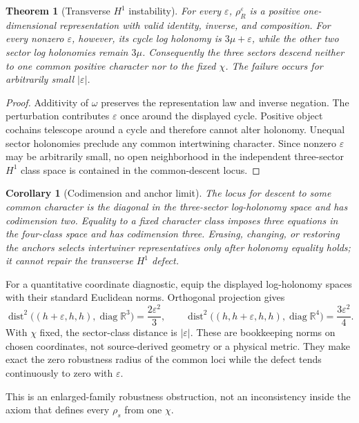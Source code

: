 \documentclass[11pt]{article}
\newtheorem{theorem}{Theorem}
\newtheorem{corollary}{Corollary}
\newcommand{\R}{\mathbb{R}}
\begin{document}
\begin{theorem}[Transverse $H^1$ instability]
For every $\varepsilon$, $\rho_R^\varepsilon$ is a positive
one-dimensional representation with valid identity, inverse, and composition.
For every nonzero $\varepsilon$, however, its cycle log holonomy is
$3\mu+\varepsilon$, while the other two sector log holonomies remain $3\mu$.
Consequently the three sectors descend neither to one common positive
character nor to the fixed $\chi$.  The failure occurs for arbitrarily small
$|\varepsilon|$.
\end{theorem}

\begin{proof}
Additivity of $\omega$ preserves the representation law and inverse negation.
The perturbation contributes $\varepsilon$ once around the displayed cycle.
Positive object cochains telescope around a cycle and therefore cannot alter
holonomy.  Unequal sector holonomies preclude any common intertwining
character.  Since nonzero $\varepsilon$ may be arbitrarily small, no open
neighborhood in the independent three-sector $H^1$ class space is contained
in the common-descent locus.
\end{proof}

\begin{corollary}[Codimension and anchor limit]
The locus for descent to some common character is the diagonal in the
three-sector log-holonomy space and has codimension two.  Equality to a fixed
character class imposes three equations in the four-class space and has
codimension three.  Erasing, changing, or restoring the anchors selects
intertwiner representatives only after holonomy equality holds; it cannot
repair the transverse $H^1$ defect.
\end{corollary}

For a quantitative coordinate diagnostic, equip the displayed log-holonomy
spaces with their standard Euclidean norms.  Orthogonal projection gives
\[
 \operatorname{dist}^2\bigl((h+\varepsilon,h,h),\operatorname{diag}\R^3\bigr)
   =\frac{2\varepsilon^2}{3},\qquad
 \operatorname{dist}^2\bigl((h,h+\varepsilon,h,h),\operatorname{diag}\R^4\bigr)
   =\frac{3\varepsilon^2}{4}.
\]
With $\chi$ fixed, the sector-class distance is $|\varepsilon|$.  These are
bookkeeping norms on chosen coordinates, not source-derived geometry or a
physical metric.  They make exact the zero robustness radius of the common
loci while the defect tends continuously to zero with $\varepsilon$.

This is an enlarged-family robustness obstruction, not an inconsistency inside
the axiom that defines every $\rho_s$ from one $\chi$.
\end{document}
